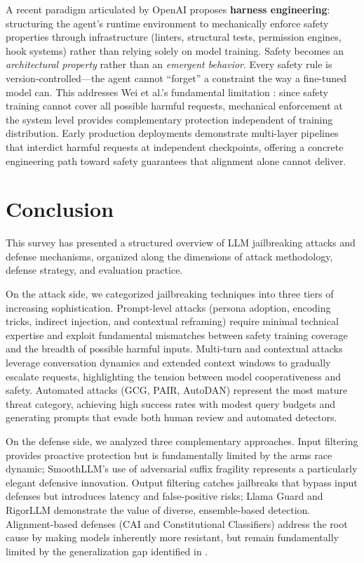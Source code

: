 \documentclass[conference]{IEEEtran}
\begin{document}
A recent paradigm articulated by OpenAI \cite{openai2026harness} proposes \textbf{harness engineering}: structuring the agent's runtime environment to mechanically enforce safety properties through infrastructure (linters, structural tests, permission engines, hook systems) rather than relying solely on model training. Safety becomes an \textit{architectural property} rather than an \textit{emergent behavior}. Every safety rule is version-controlled—the agent cannot ``forget'' a constraint the way a fine-tuned model can. This addresses Wei et al.'s fundamental limitation \cite{wei2023jailbroken}: since safety training cannot cover all possible harmful requests, mechanical enforcement at the system level provides complementary protection independent of training distribution. Early production deployments demonstrate multi-layer pipelines that interdict harmful requests at independent checkpoints, offering a concrete engineering path toward safety guarantees that alignment alone cannot deliver.


\section{Conclusion}

This survey has presented a structured overview of LLM jailbreaking attacks and defense mechanisms, organized along the dimensions of attack methodology, defense strategy, and evaluation practice.

On the attack side, we categorized jailbreaking techniques into three tiers of increasing sophistication. Prompt-level attacks (persona adoption, encoding tricks, indirect injection, and contextual reframing) require minimal technical expertise and exploit fundamental mismatches between safety training coverage and the breadth of possible harmful inputs. Multi-turn and contextual attacks leverage conversation dynamics and extended context windows to gradually escalate requests, highlighting the tension between model cooperativeness and safety. Automated attacks (GCG, PAIR, AutoDAN) represent the most mature threat category, achieving high success rates with modest query budgets and generating prompts that evade both human review and automated detectors.

On the defense side, we analyzed three complementary approaches. Input filtering provides proactive protection but is fundamentally limited by the arms race dynamic; SmoothLLM's use of adversarial suffix fragility represents a particularly elegant defensive innovation. Output filtering catches jailbreaks that bypass input defenses but introduces latency and false-positive risks; Llama Guard and RigorLLM demonstrate the value of diverse, ensemble-based detection. Alignment-based defenses (CAI and Constitutional Classifiers) address the root cause by making models inherently more resistant, but remain fundamentally limited by the generalization gap identified in \cite{wei2023jailbroken}.
\end{document}
